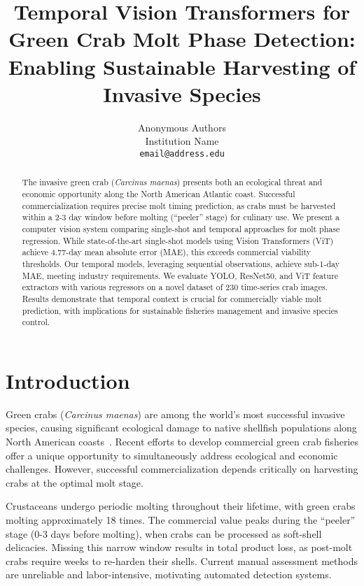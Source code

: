 \documentclass[10pt,twocolumn,letterpaper]{article}
\begin{document}
\title{Temporal Vision Transformers for Green Crab Molt Phase Detection:\\
Enabling Sustainable Harvesting of Invasive Species}

\author{Anonymous Authors\\
Institution Name\\
{\tt\small email@address.edu}
}

\maketitle

\begin{abstract}
The invasive green crab (\textit{Carcinus maenas}) presents both an ecological threat and economic opportunity along the North American Atlantic coast. Successful commercialization requires precise molt timing prediction, as crabs must be harvested within a 2-3 day window before molting (``peeler'' stage) for culinary use. We present a computer vision system comparing single-shot and temporal approaches for molt phase regression. While state-of-the-art single-shot models using Vision Transformers (ViT) achieve 4.77-day mean absolute error (MAE), this exceeds commercial viability thresholds. Our temporal models, leveraging sequential observations, achieve sub-1-day MAE, meeting industry requirements. We evaluate YOLO, ResNet50, and ViT feature extractors with various regressors on a novel dataset of 230 time-series crab images. Results demonstrate that temporal context is crucial for commercially viable molt prediction, with implications for sustainable fisheries management and invasive species control.
\end{abstract}

\section{Introduction}

Green crabs (\textit{Carcinus maenas}) are among the world's most successful invasive species, causing significant ecological damage to native shellfish populations along North American coasts~\cite{invasive2020}. Recent efforts to develop commercial green crab fisheries offer a unique opportunity to simultaneously address ecological and economic challenges. However, successful commercialization depends critically on harvesting crabs at the optimal molt stage.

Crustaceans undergo periodic molting throughout their lifetime, with green crabs molting approximately 18 times. The commercial value peaks during the ``peeler'' stage (0-3 days before molting), when crabs can be processed as soft-shell delicacies. Missing this narrow window results in total product loss, as post-molt crabs require weeks to re-harden their shells. Current manual assessment methods are unreliable and labor-intensive, motivating automated detection systems.
\end{document}
